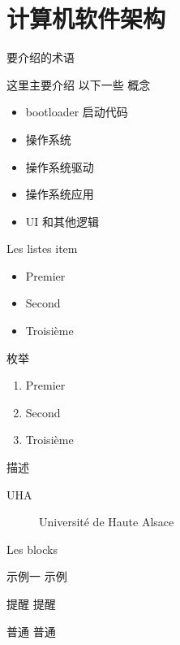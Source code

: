 \documentclass[10pt]{beamer}
\begin{document}
\section{计算机软件架构}

\begin{frame}[fragile]{要介绍的术语}

这里主要介绍 以下一些 概念
\begin{itemize}
\item bootloader 启动代码
\item 操作系统
\item 操作系统驱动
\item 操作系统应用
\item UI 和其他逻辑
\end{itemize}

\end{frame}


\begin{frame}{Les listes}
	item
	\begin{itemize}
		\item Premier
		\item Second
		\item Troisième
	\end{itemize}

	枚举
	\begin{enumerate}
		\item Premier
		\item Second
		\item Troisième
	\end{enumerate}

	描述
	\begin{description}
		\item [UHA] Université de Haute Alsace
	\end{description}
\end{frame}

\begin{frame}{Les blocks}
	\begin{exampleblock}{示例一}
		示例
	\end{exampleblock}
	\begin{alertblock}{提醒}
		提醒
	\end{alertblock}
	\begin{block}{普通}
		普通
	\end{block}
\end{frame}
\end{document}
